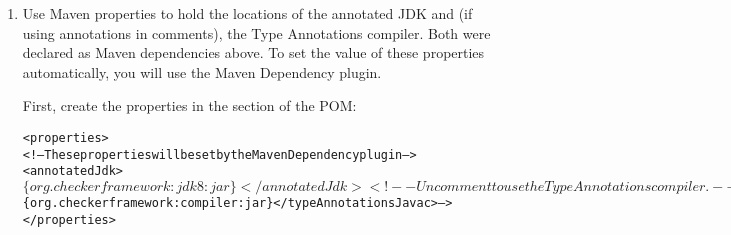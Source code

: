 {\begin{enumerate}
\begin{enumerate}
\begin{alltt}
    <!-- Annotations from the Checker Framework: nullness, interning, locking, ... -->
    <dependency>
      <groupId>org.checkerframework</groupId>
      <artifactId>checker-qual</artifactId>
      <version>\ReleaseVersion{}</version>
      <scope>system</scope>
      <systemPath>\$\{env.CHECKERFRAMEWORK\}/checker/dist/checker-qual.jar</systemPath>
    </dependency>
    <dependency>
      <groupId>org.checkerframework</groupId>
      <artifactId>checker</artifactId>
      <version>\ReleaseVersion{}</version>
      <scope>system</scope>
      <systemPath>\$\{env.CHECKERFRAMEWORK\}/checker/dist/checker.jar</systemPath>
    </dependency>
    <!-- The Type Annotations compiler. Uncomment if using annotations in comments. -->
    <!-- <dependency>
      <groupId>org.checkerframework</groupId>
      <artifactId>compiler</artifactId>
      <version>\ReleaseVersion{}</version>
      <scope>system</scope>
      <systemPath>\$\{env.CHECKERFRAMEWORK\}/checker/dist/javac.jar</systemPath>
    </dependency> -->
    <!-- The annotated JDK to use. -->
    <dependency>
      <groupId>org.checkerframework</groupId>
      <artifactId>jdk8</artifactId>
      <version>\ReleaseVersion{}</version>
      <scope>system</scope>
      <systemPath>\$\{env.CHECKERFRAMEWORK\}/checker/dist/jdk8.jar</systemPath>
    </dependency>
  </dependencies>
\end{alltt}
\end{enumerate}

Periodically update to the most recent version, to obtain the
latest bug fixes and new features:
\begin{Verbatim}
  mvn versions:use-latest-versions -Dincludes="org.checkerframework:*"
\end{Verbatim}


\item Use Maven properties to hold the locations of the
  annotated JDK and (if using annotations in comments), the Type Annotations compiler.  Both were declared as Maven dependencies above.
To set the value of these properties automatically, you will use the Maven Dependency plugin.

First, create the properties in the  section of the POM:

\begin{alltt}
<properties>
  <!-- These properties will be set by the Maven Dependency plugin -->
  <annotatedJdk>$\{org.checkerframework:jdk8:jar\}</annotatedJdk>
  <!-- Uncomment to use the Type Annotations compiler. -->
  <!-- <typeAnnotationsJavac>$\{org.checkerframework:compiler:jar\}</typeAnnotationsJavac> -->
</properties>
\end{alltt}


\end{enumerate}}
